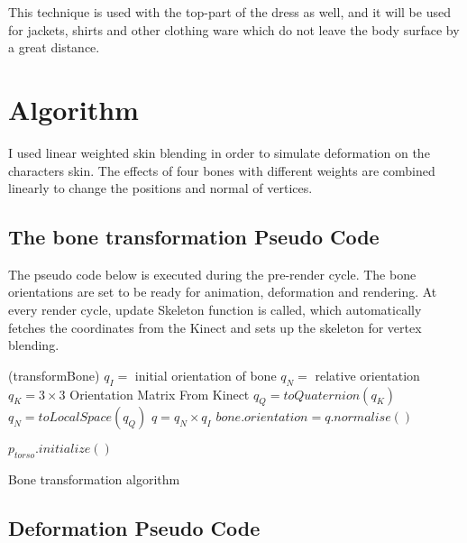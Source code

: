 This technique is used with the top-part of the dress as well, and it will be used for jackets, shirts and other clothing ware which do not leave the body surface by a great distance. 

\section{Algorithm}
\label{section5_3}

I used linear weighted skin blending \cite{Kavan2003} in order to simulate deformation on the characters skin. The effects of four bones with different weights are combined linearly to change the positions and normal of vertices.

\subsection{The bone transformation Pseudo Code}

The pseudo code below is executed during the pre-render cycle. The bone
orientations are set to be ready for animation, deformation and rendering. At
every render cycle, update Skeleton function is called, which automatically fetches the coordinates from the Kinect and sets up the skeleton for vertex blending.

\begin{algorithm}
\dontprintsemicolon %
\function(transformBone){
$q_I =$ initial orientation of bone\;
$q_N =$ relative orientation\;
$q_K = 3\times3$ Orientation Matrix From Kinect\;
 {
  $q_Q = toQuaternion(q_K)$\;
  $q_N = toLocalSpace(q_Q)$\;
  $q = q_N \times q_I$\;
  $bone.orientation=q.normalise{\left(\right)}$\; }}

 {
  $p_{torso}.initialize()$  \;
 }
\caption{Bone transformation algorithm}
\label{algo:transformBone}
\end{algorithm}

\subsection{Deformation Pseudo Code}


